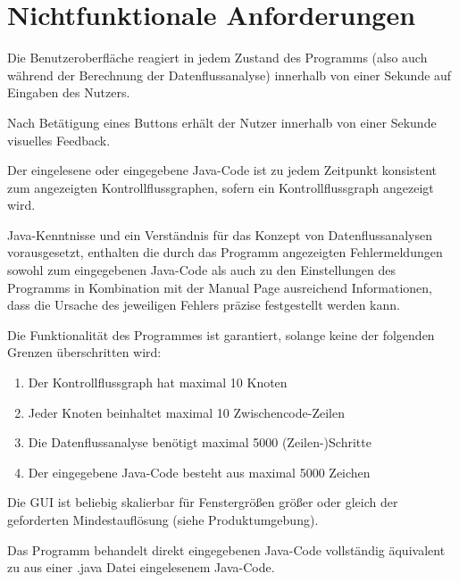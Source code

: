 
\section{Nichtfunktionale Anforderungen}


Die Benutzeroberfläche reagiert in jedem Zustand des Programms (also auch während der Berechnung der Datenflussanalyse) innerhalb von einer Sekunde auf Eingaben des Nutzers.


Nach Betätigung eines Buttons erhält der Nutzer innerhalb von einer Sekunde visuelles Feedback.


Der eingelesene oder eingegebene Java-Code ist zu jedem Zeitpunkt konsistent zum angezeigten Kontrollflussgraphen, sofern ein Kontrollflussgraph angezeigt wird.


Java-Kenntnisse und ein Verständnis für das Konzept von Datenflussanalysen vorausgesetzt, enthalten die durch das Programm angezeigten Fehlermeldungen sowohl zum eingegebenen Java-Code als auch zu den Einstellungen des Programms in Kombination mit der Manual Page ausreichend Informationen, dass die Ursache des jeweiligen Fehlers präzise festgestellt werden kann.


Die Funktionalität des Programmes ist garantiert, solange keine der folgenden Grenzen überschritten wird:
\begin{enumerate}[label=(\alph*)]
\item Der Kontrollflussgraph hat maximal 10 Knoten
\item Jeder Knoten beinhaltet maximal 10 Zwischencode-Zeilen
\item Die Datenflussanalyse benötigt maximal 5000 (Zeilen-)Schritte
\item Der eingegebene Java-Code besteht aus maximal 5000 Zeichen
\end{enumerate}


Die GUI ist beliebig skalierbar für Fenstergrößen größer oder gleich der geforderten Mindestauflösung (siehe Produktumgebung).


Das Programm behandelt direkt eingegebenen Java-Code vollständig äquivalent zu aus einer .java Datei eingelesenem Java-Code.
